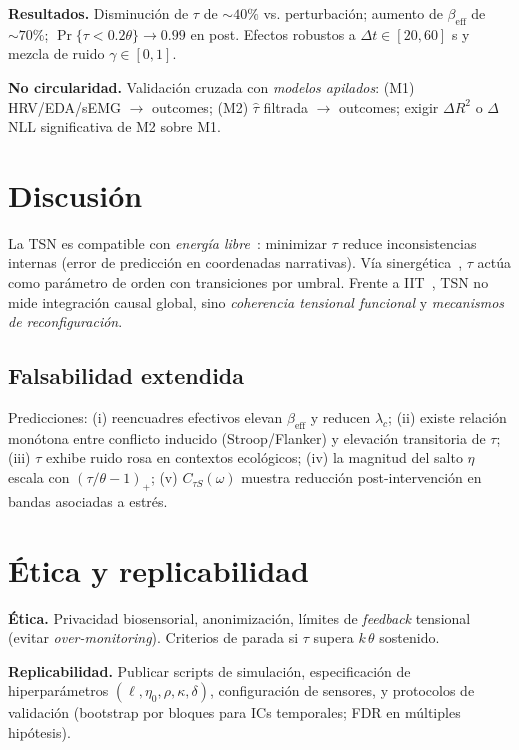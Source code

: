 \documentclass[10pt,a4paper,twocolumn]{article}
\theoremstyle{definition}
\theoremstyle{plain}
\begin{document}
\textbf{Resultados.} Disminución de \(\tau\) de \(\sim 40\%\) vs. perturbación; aumento de \(\beta_{\mathrm{eff}}\) de \(\sim 70\%\); \(\Pr\{\tau<0.2\theta\}\to 0.99\) en post. Efectos robustos a \(\Delta t\in[20,60]\) s y mezcla de ruido \(\gamma\in[0,1]\).

\textbf{No circularidad.} Validación cruzada con \emph{modelos apilados}: (M1) HRV/EDA/sEMG \(\to\) outcomes; (M2) \(\hat\tau\) filtrada \(\to\) outcomes; exigir \(\Delta R^2\) o \(\Delta\)NLL significativa de M2 sobre M1.

\section{Discusión}
La TSN es compatible con \emph{energía libre}~\cite{friston2010}: minimizar \(\tau\) reduce inconsistencias internas (error de predicción en coordenadas narrativas). Vía sinergética~\cite{haken1983,haken1983adv}, \(\tau\) actúa como parámetro de orden con transiciones por umbral. Frente a IIT~\cite{tononi2015}, TSN no mide integración causal global, sino \emph{coherencia tensional funcional} y \emph{mecanismos de reconfiguración}.

\subsection{Falsabilidad extendida}
Predicciones: 
(i) reencuadres efectivos elevan \(\beta_{\mathrm{eff}}\) y reducen \(\lambda_c\); 
(ii) existe relación monótona entre conflicto inducido (Stroop/Flanker) y elevación transitoria de \(\tau\); 
(iii) \(\tau\) exhibe ruido rosa en contextos ecológicos; 
(iv) la magnitud del salto \(\eta\) escala con \((\tau/\theta-1)_+\); 
(v) \(C_{\tau S}(\omega)\) muestra reducción post-intervención en bandas asociadas a estrés.

\section{Ética y replicabilidad}
\textbf{Ética.} Privacidad biosensorial, anonimización, límites de \emph{feedback} tensional (evitar \emph{over-monitoring}). Criterios de parada si \(\tau\) supera \(k\,\theta\) sostenido.

\textbf{Replicabilidad.} Publicar scripts de simulación, especificación de hiperparámetros \((\ell,\eta_0,\rho,\kappa,\delta)\), configuración de sensores, y protocolos de validación (bootstrap por bloques para ICs temporales; FDR en múltiples hipótesis).
\end{document}
